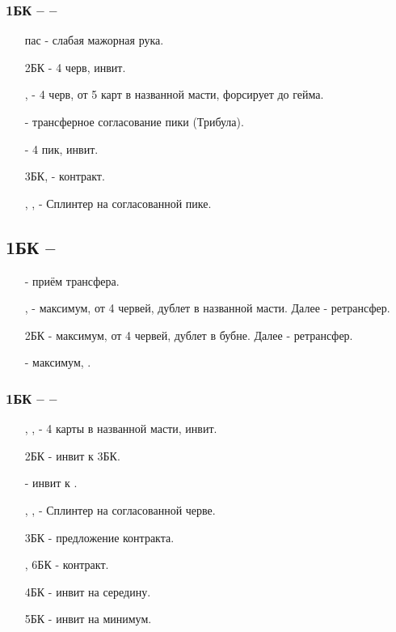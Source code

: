\documentclass{article}
\begin{document}
\subsubsection{1БК --  -- }
\begin{enumerate}
    \item[пас] - слабая мажорная рука.
    \item[2БК] - 4 черв, инвит.
    \item[\cl{3}, \di{3}] - 4 черв, от 5 карт в названной масти, форсирует до гейма.
    \item[\he{3}] - трансферное согласование пики (Трибула).
    \item[\sp{3}] - 4 пик, инвит.
    \item[3БК, \sp{4}] - контракт.
    \item[\cl{4}, \di{4}, \he{4}] - Сплинтер на согласованной пике.
\end{enumerate}
\subsection{1БК -- }
\begin{enumerate}
    \item[\he{2}] - приём трансфера.
    \item[\sp{2}, \cl{3}] - максимум, от 4 червей, дублет в названной масти. Далее  - ретрансфер.
    \item[2БК] - максимум, от 4 червей, дублет в бубне. Далее  - ретрансфер.
    \item[\he{3}] - максимум, .
\end{enumerate}
\subsubsection{1БК --  -- }
\begin{enumerate}
    \item[\sp{2}, \cl{3}, \di{3}] - 4 карты в названной масти, инвит.
    \item[2БК] - инвит к 3БК.
    \item[\he{3}] - инвит к .
    \item[\sp{3}, \cl{4}, \di{4}] - Сплинтер на согласованной черве.
    \item[3БК] - предложение контракта.
    \item[\he{4}, 6БК] - контракт.
    \item[4БК] - инвит на середину.
    \item[5БК] - инвит на минимум.
\end{enumerate}
\end{document}
